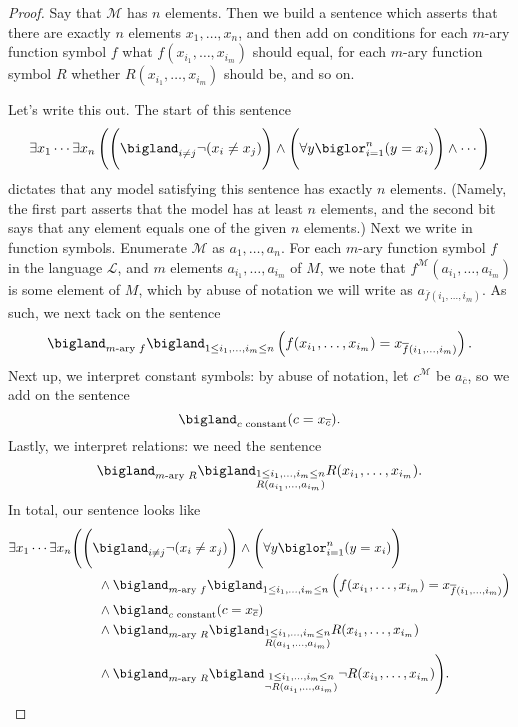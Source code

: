 \documentclass[../notes.tex]{subfiles}
\begin{document}
\begin{proof}
	Say that $\mathcal M$ has $n$ elements. Then we build a sentence which asserts that there are exactly $n$ elements $x_1,\ldots,x_n$, and then add on conditions for each $m$-ary function symbol $f$ what $f(x_{i_1},\ldots,x_{i_m})$ should equal, for each $m$-ary function symbol $R$ whether $R(x_{i_1},\ldots,x_{i_m})$ should be, and so on.

	Let's write this out. The start of this sentence
	\[\exists x_1\cdots\exists x_n\left(\Bigg(\bigland_{i\ne j}\lnot(x_i\ne x_j)\Bigg)\land\Bigg(\forall y\biglor_{i=1}^n(y=x_i)\Bigg)\land\cdots\right)\]
	dictates that any model satisfying this sentence has exactly $n$ elements. (Namely, the first part asserts that the model has at least $n$ elements, and the second bit says that any element equals one of the given $n$ elements.) Next we write in function symbols. Enumerate $\mathcal M$ as $a_1,\ldots,a_n$. For each $m$-ary function symbol $f$ in the language $\mathcal L$, and $m$ elements $a_{i_1},\ldots,a_{i_m}$ of $M$, we note that $f^\mathcal M(a_{i_1},\ldots,a_{i_m})$ is some element of $M$, which by abuse of notation we will write as $a_{\overline f(i_1,\ldots,i_m)}$. As such, we next tack on the sentence
	\[\bigland_{m\text{-ary }f}\bigland_{1\le i_1,\ldots,i_m\le n}\left(f(x_{i_1},\ldots,x_{i_m})=x_{\overline f(i_1,\ldots,i_m)}\right).\]
	Next up, we interpret constant symbols: by abuse of notation, let $c^\mathcal M$ be $a_{\overline c}$, so we add on the sentence
	\[\bigland_{c\text{ constant}}(c=x_{\overline c}).\]
	Lastly, we interpret relations: we need the sentence
	\[\bigland_{m\text{-ary }R}\bigland_{\substack{1\le i_1,\ldots,i_m\le n\\R(a_{i_1},\ldots,a_{i_m})}}R(x_{i_1},\ldots,x_{i_m}).\]
	In total, our sentence looks like
	\begin{align*}
		\exists x_1\cdots\exists x_n&\Bigg(\Bigg(\bigland_{i\ne j}\lnot(x_i\ne x_j)\Bigg)\land\Bigg(\forall y\biglor_{i=1}^n(y=x_i)\Bigg) \\
		&\qquad\land\bigland_{m\text{-ary }f}\bigland_{1\le i_1,\ldots,i_m\le n}\left(f(x_{i_1},\ldots,x_{i_m})=x_{\overline f(i_1,\ldots,i_m)}\right) \\
		&\qquad\land\bigland_{c\text{ constant}}(c=x_{\overline c}) \\
		&\qquad\land\bigland_{m\text{-ary }R}\bigland_{\substack{1\le i_1,\ldots,i_m\le n\\R(a_{i_1},\ldots,a_{i_m})}}R(x_{i_1},\ldots,x_{i_m}) \\
		&\qquad\land\bigland_{m\text{-ary }R}\bigland_{\substack{1\le i_1,\ldots,i_m\le n\\\lnot R(a_{i_1},\ldots,a_{i_m})}}\lnot R(x_{i_1},\ldots,x_{i_m}) \Bigg).

\end{align*}
\end{proof}
\end{document}
